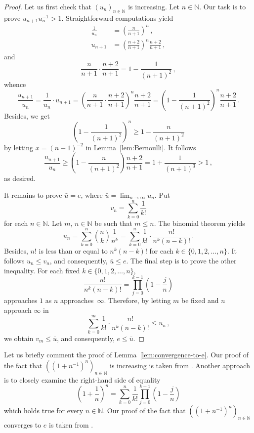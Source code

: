 \documentclass[12pt,a4paper]{article}
\newcommand{\bN}{\mathbb{N}}
\begin{document}
\begin{proof}
  Let us first check that $\left( u_n \right)_{n \in \bN}$ is increasing.
  Let $n \in \bN$.
  Our task is to prove $u_{n + 1} u_n^{-1} > 1$.
  Straightforward computations yield
  \begin{align*}
    \frac{1}{u_n} & = \left( \frac{n}{n + 1}  \right)^n \,, \\
    u_{n + 1} & = \left( \frac{n + 2}{n + 1} \right)^n
                \frac{n + 2}{n + 1} \,,
  \end{align*}
  and 
  $$
  \frac{n}{n + 1}
  \cdot 
  \frac{n + 2}{n + 1}
  = 1 - \frac{1}{{(n + 1)}^2}  \,,
   $$
  whence 
  $$
  \frac{u_{n + 1}}{u_n}
  =
  \frac{1}{u_n} \cdot u_{n + 1}  
  =
  \left(
  \frac{n}{n + 1} \cdot \frac{n + 2}{n + 1}
  \right)^n
  \frac{n + 2}{n + 1}
  =
  \left( 1 - \frac{1}{{(n + 1)}^2} \right)^n 
  \frac{n + 2}{n + 1}\, .
  $$
  Besides, we get  
   $$
   \left( 1 - \frac{1}{{(n + 1)}^2}  \right)^n \ge  1 - \frac{n}{{(n + 1)}^2} 
 $$
 by letting $x = {(n + 1)}^{-2}$ in Lemma~\ref{lem:Bernoulli}.
 It follows
 $$
 \frac{u_{n + 1}} {u_n}
 \ge
 \left( 1 - \frac{n}{{(n + 1)}^2} \right)
  \frac{n + 2}{n + 1}
 =
 1 + \frac{1}{{(n + 1)}^3}
 > 1 \,, 
 $$
 as desired.
  
  It remains to prove $\bar u = e$, where $\bar u = \lim_{n \to \infty} u_n$.
  Put
  $$
  v_n = \sum_{k = 0}^n \frac{1}{k!} 
  $$
  for each $n \in \bN$.
  Let $m$, $n \in \bN$ be such that $m \le n$.
  The binomial theorem yields
  $$
  u_n
  = \sum_{k = 0}^n  \binom{n}{k} \frac{1}{n^k}
  = \sum_{k = 0}^n \frac{1}{k!} \cdot \frac{n!}{n^k {(n - k)}!} \, .
  $$
  Besides, $n!$ is less than or equal to $n^k {(n - k)}!$ for each $k \in \{ 0, 1, 2, \dotsc, n \}$.
  It follows $ u_n \le v_n$,  and consequently, $\bar u \le e$.
  The final step is to prove the other inequality.
 For each fixed $k \in \{ 0, 1, 2, \dotsc, n \}$, 
  $$
  \frac{n!}{{n^k (n - k)}!} = \prod_{j = 0}^{k - 1} \left( 1 - \frac{j}{n} \right) 
 $$
 approaches $1$ as $n$ approaches~$\infty$.
 Therefore, by letting $m$ be fixed and $n$ approach $\infty$ in 
 $$
  \sum_{k = 0}^m \frac{1}{k!} \cdot \frac{n!}{n^k {(n - k)}!} \le u_n \,, 
  $$
  we obtain $v_m \le \bar u$, and consequently, $e \le \bar u$.
\end{proof}


Let us briefly comment the proof of Lemma~\ref{lem:convergence-to-e}.
Our proof of the fact that $\left( \left( 1 + n^{-1} \right)^n  \right)_{n \in \bN}$
is increasing is taken from \cite{Wiener85}.
Another approach \cite{GiaquintaModicaApprox} is to closely examine the right-hand side of equality 
$$ 
\left(1 + \frac{1}{n} \right)^n = \sum_{k = 0}^n \frac{1}{k!} \prod_{j = 0}^{k - 1} \left(1 - \frac{j}{n} \right) 
$$
which holds true for every $n \in \bN$.
Our proof of the fact that
$\left( \left( 1 + n^{-1} \right)^n  \right)_{n \in \bN}$ converges to $e$ is taken from \cite{RudinPrinciples}.
\end{document}

